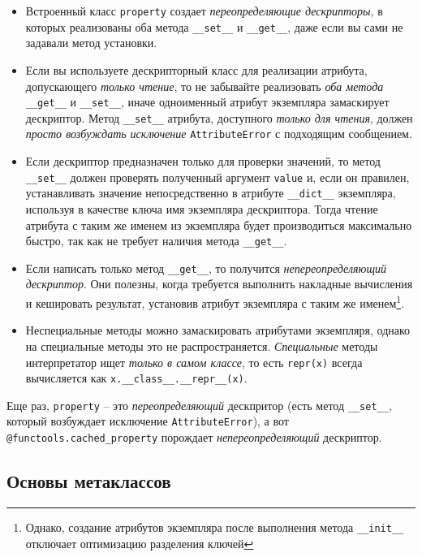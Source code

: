 \documentclass[%
	11pt,
	a4paper,
	utf8,
		]{article}
\begin{document}
\begin{itemize}
	\item Встроенный класс \verb*|property| создает \emph{переопределяющие дескрипторы}, в которых реализованы оба метода \verb|__set__| и \verb*|__get__|, даже если вы сами не задавали метод установки.
	
	\item Если вы используете дескрипторный класс для реализации атрибута, допускающего \emph{только чтение}, то не забывайте реализовать \emph{оба метода} \verb|__get__| и \verb*|__set__|, иначе одноименный атрибут экземпляра замаскирует дескриптор. Метод \verb|__set__| атрибута, доступного \emph{только для чтения}, должен \emph{просто возбуждать исключение} \verb*|AttributeError| с подходящим сообщением.
	
	\item Если дескриптор предназначен только для проверки значений, то метод \verb|__set__| должен проверять полученный аргумент \verb*|value| и, если он правилен, устанавливать значение непосредственно в атрибуте \verb|__dict__| экземпляра, используя в качестве ключа имя экземпляра дескриптора. Тогда чтение атрибута с таким же именем из экземпляра будет производиться максимально быстро, так как не требует наличия метода \verb*|__get__|.
	
	\item Если написать только метод \verb|__get__|, то получится \emph{непереопределяющий дескриптор}. Они полезны, когда требуется выполнить накладные вычисления и кешировать результат, установив атрибут экземпляра с таким же именем\footnote{Однако, создание атрибутов экземпляра после выполнения метода \texttt{\_\_init\_\_} отключает оптимизацию разделения ключей}.
	
	\item Неспециальные методы можно замаскировать атрибутами экземпляря, однако на специальные методы это не распространяется. {\color{blue}\emph{Специальные} методы интерпретатор ищет \emph{только в самом классе}}, то есть \verb*|repr(x)| всегда вычисляется как \verb|x.__class__.__repr__(x)|.
\end{itemize}

Еще раз, \verb*|property| -- это \emph{переопределяющий} дескпритор (есть метод \verb|__set__|, который возбуждает исключение \verb*|AttributeError|), а вот \verb|@functools.cached_property| порождает \emph{непереопределяющий} дескриптор.

\subsection{Основы метаклассов}
\end{document}
